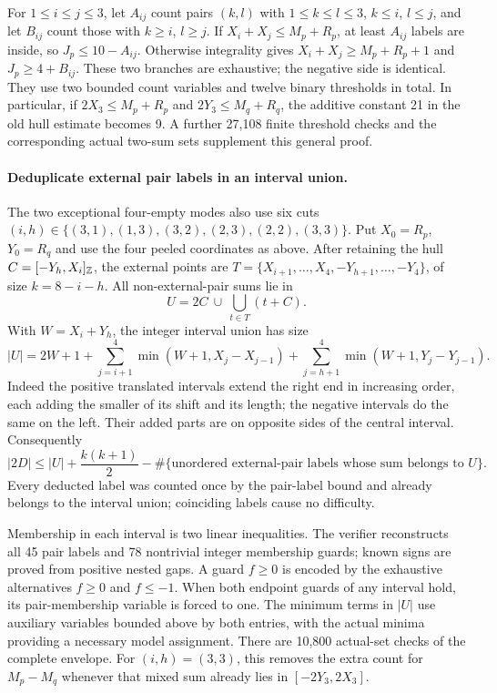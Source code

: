 \documentclass[11pt,a4paper]{article}
\begin{document}
For $1\le i\le j\le3$, let $A_{ij}$ count pairs $(k,l)$ with
$1\le k\le l\le3$, $k\le i$, $l\le j$, and let $B_{ij}$ count those
with $k\ge i$, $l\ge j$. If $X_i+X_j\le M_p+R_p$, at least $A_{ij}$
labels are inside, so $J_p\le10-A_{ij}$. Otherwise integrality gives
$X_i+X_j\ge M_p+R_p+1$ and $J_p\ge4+B_{ij}$. These two branches are
exhaustive; the negative side is identical. They use two bounded count
variables and twelve binary thresholds in total. In particular, if
$2X_3\le M_p+R_p$ and $2Y_3\le M_q+R_q$, the additive constant 21 in
the old hull estimate becomes 9. A further 27,108 finite threshold checks
and the corresponding actual two-sum sets supplement this general proof.

\paragraph{Deduplicate external pair labels in an interval union.}
The two exceptional four-empty modes also use six cuts
$(i,h)\in\{(3,1),(1,3),(3,2),(2,3),(2,2),(3,3)\}$.
Put $X_0=R_p$, $Y_0=R_q$ and use the four peeled coordinates as above.
After retaining the hull $C=[-Y_h,X_i]_{\mathbb Z}$, the external points are
$T=\{X_{i+1},\ldots,X_4,-Y_{h+1},\ldots,-Y_4\}$, of size $k=8-i-h$.
All non-external-pair sums lie in
\[
 U=2C\ \cup\ \bigcup_{t\in T}(t+C).
\]
With $W=X_i+Y_h$, the integer interval union has size
\[
 |U|=2W+1+\sum_{j=i+1}^4\min(W+1,X_j-X_{j-1})
             +\sum_{j=h+1}^4\min(W+1,Y_j-Y_{j-1}).
\]
Indeed the positive translated intervals extend the right end in increasing
order, each adding the smaller of its shift and its length; the negative
intervals do the same on the left. Their added parts are on opposite sides
of the central interval. Consequently
\[
 |2D|\le |U|+\frac{k(k+1)}2-
     \#\{\text{unordered external-pair labels whose sum belongs to }U\}.
\]
Every deducted label was counted once by the pair-label bound and already
belongs to the interval union; coinciding labels cause no difficulty.

Membership in each interval is two linear inequalities. The verifier
reconstructs all 45 pair labels and 78 nontrivial integer membership guards;
known signs are proved from positive nested gaps. A guard $f\ge0$ is
encoded by the exhaustive alternatives $f\ge0$ and $f\le-1$.
When both endpoint guards of any interval hold, its pair-membership variable
is forced to one. The minimum terms in $|U|$ use auxiliary variables bounded
above by both entries, with the actual minima providing a necessary model
assignment. There are 10,800 actual-set checks of the complete envelope.
For $(i,h)=(3,3)$, this removes the extra count for $M_p-M_q$ whenever
that mixed sum already lies in $[-2Y_3,2X_3]$.
\end{document}
